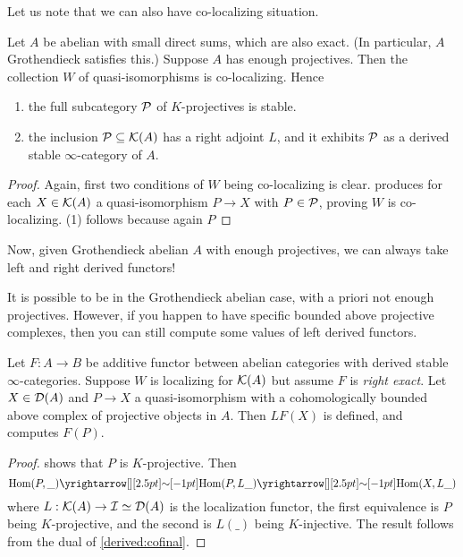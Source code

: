 \documentclass{article}
\begin{document}
Let us note that we can also have co-localizing situation.
\begin{prop}
  Let $A$ be abelian with small direct sums,
  which are also exact. (In particular, $A$ Grothendieck satisfies this.)
  Suppose $A$ has enough projectives.
  Then the collection $W$ of quasi-isomorphisms is co-localizing.
  Hence \begin{enumerate}
    \item the full subcategory $\mathcal{P}$ of $K$-projectives is stable.
    \item the inclusion $\mathcal{P} \subseteq \mathcal{K}(A)$ has a right adjoint $L$,
    and it exhibits $\mathcal{P}$ as a derived stable $\infty$-category of $A$.
  \end{enumerate}
\end{prop}
\begin{proof}
  Again, first two conditions of $W$ being co-localizing is clear.
  \cite[Theorem 14.4.3]{KS06} produces for each $X \in \mathcal{K}(A)$
  a quasi-isomorphism $P \to X$ with $P \in \mathcal{P}$,
  proving $W$ is co-localizing.
  (1) follows because again $P$
\end{proof}
Now, given Grothendieck abelian $A$ with enough projectives,
we can always take left and right derived functors!

It is possible to be in the Grothendieck abelian case,
with a priori not enough projectives.
However, if you happen to have specific bounded above
projective complexes, then you can still compute some values of 
left derived functors.
\begin{prop}
  
  Let $F : A \to B$ be additive functor between abelian categories
  with derived stable $\infty$-categories.
  Suppose $W$ is localizing for $\mathcal{K}(A)$ but assume $F$ is \emph{right exact}.
  Let $X \in \mathcal{D}(A)$ and $P \to X$ a quasi-isomorphism
  with a cohomologically bounded above complex of projective objects in $A$.
  Then $LF(X)$ is defined, and computes $F(P)$.
\end{prop}
\begin{proof}
  \cite[Lem. 1.3.2.20]{lurie-HA} shows that $P$ is $K$-projective.
  Then \[
    \HOM(P , \_) \map{\sim}{} \HOM(P , L \_) \map{\sim}{} \HOM(X , L \_)
  \]
  where $L : \mathcal{K}(A) \to \mathcal{I} \simeq \mathcal{D}(A)$ is the localization functor,
  the first equivalence is $P$ being $K$-projective,
  and the second is $L(\_)$ being $K$-injective.
  The result follows from the dual of \ref{derived:cofinal}.
\end{proof}
\end{document}
